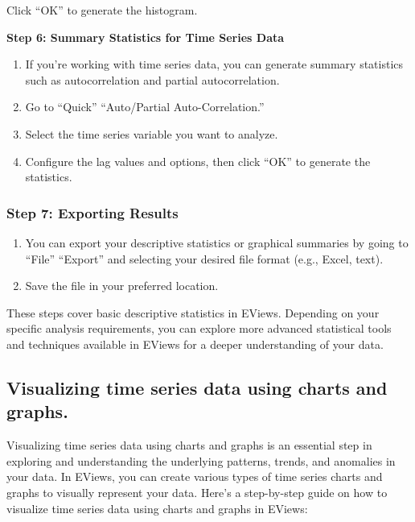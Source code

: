\documentclass[
  letterpaper,
  DIV=11,
  numbers=noendperiod]{scrartcl}
\begin{document}
Click ``OK'' to generate the histogram.

\textbf{Step 6: Summary Statistics for Time Series Data}

\begin{enumerate}
\def\labelenumi{\arabic{enumi}.}
\item
  If you're working with time series data, you can generate summary
  statistics such as autocorrelation and partial autocorrelation.
\item
  Go to ``Quick'' ``Auto/Partial Auto-Correlation.''
\item
  Select the time series variable you want to analyze.
\item
  Configure the lag values and options, then click ``OK'' to generate
  the statistics.
\end{enumerate}

\hypertarget{step-7-exporting-results}{%
\subsubsection{\texorpdfstring{\textbf{Step 7: Exporting
Results}}{Step 7: Exporting Results}}\label{step-7-exporting-results}}

\begin{enumerate}
\def\labelenumi{\arabic{enumi}.}
\item
  You can export your descriptive statistics or graphical summaries by
  going to ``File'' ``Export'' and selecting your desired file format
  (e.g., Excel, text).
\item
  Save the file in your preferred location.
\end{enumerate}

These steps cover basic descriptive statistics in EViews. Depending on
your specific analysis requirements, you can explore more advanced
statistical tools and techniques available in EViews for a deeper
understanding of your data.

\hypertarget{visualizing-time-series-data-using-charts-and-graphs.}{%
\subsection{Visualizing time series data using charts and
graphs.}\label{visualizing-time-series-data-using-charts-and-graphs.}}

Visualizing time series data using charts and graphs is an essential
step in exploring and understanding the underlying patterns, trends, and
anomalies in your data. In EViews, you can create various types of time
series charts and graphs to visually represent your data. Here's a
step-by-step guide on how to visualize time series data using charts and
graphs in EViews:
\end{document}
